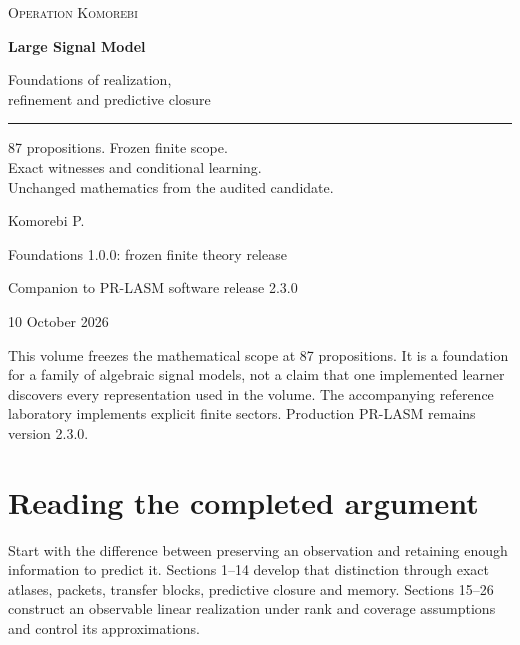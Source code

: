 \documentclass[11pt,letterpaper]{article}
\begin{document}
\hypersetup{pageanchor=false}
\begin{titlepage}
\vspace*{0.5in}
{\small\textsc{Operation Komorebi}\par}
\vspace{0.72in}
{\fontsize{33}{39}\selectfont\bfseries Large Signal Model\par}
\vspace{0.3in}
{\fontsize{21}{27}\selectfont Foundations of realization,\\refinement and predictive closure\par}
\vspace{0.45in}
\rule{\textwidth}{0.45pt}\par
\vspace{0.3in}
\begin{minipage}{0.95\textwidth}
\large
87 propositions. Frozen finite scope.\\Exact witnesses and conditional learning.\\Unchanged mathematics from the audited candidate.
\end{minipage}
\vfill
{\Large Komorebi P.\par}
\vspace{0.2in}
{\normalsize Foundations 1.0.0: frozen finite theory release\par}
{\normalsize Companion to PR-LASM software release 2.3.0\par}
{\normalsize 10 October 2026\par}
\end{titlepage}
\hypersetup{pageanchor=true}
\begingroup\footnotesize\setlength{\cftbeforesecskip}{0pt}\tableofcontents\endgroup\newpage

This volume freezes the mathematical scope at 87 propositions. It is a
foundation for a family of algebraic signal models, not a claim that one
implemented learner discovers every representation used in the volume.
The accompanying reference laboratory implements explicit finite
sectors. Production PR-LASM remains version 2.3.0.

\section{Reading the completed
argument}\label{reading-the-completed-argument}

Start with the difference between preserving an observation and
retaining enough information to predict it. Sections 1--14 develop that
distinction through exact atlases, packets, transfer blocks, predictive
closure and memory. Sections 15--26 construct an observable linear
realization under rank and coverage assumptions and control its
approximations.
\end{document}
